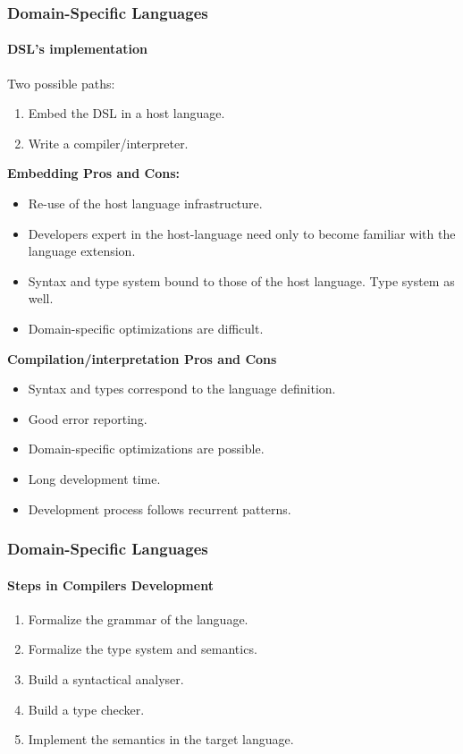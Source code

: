 \documentclass[10pt,a4paper]{beamer}
\begin{document}
\begin{frame}
\frametitle{Domain-Specific Languages}
\framesubtitle{DSL's implementation}

Two possible paths:

\begin{enumerate}
	\item Embed the DSL in a host language.
	\item Write a compiler/interpreter.
\end{enumerate}

\textbf{Embedding Pros and Cons:}

\begin{itemize}
	\item Re-use of the host language infrastructure.
	\item Developers expert in the host-language need only to become familiar with the language extension.
	\item Syntax and type system bound to those of the host language. Type system as well.
	\item Domain-specific optimizations are difficult.
\end{itemize}

\textbf{Compilation/interpretation Pros and Cons}

\begin{itemize}
	\item Syntax and types correspond to the language definition.
	\item Good error reporting.
	\item Domain-specific optimizations are possible.
	\item Long development time.
	\item Development process follows recurrent patterns.
\end{itemize}
\end{frame}

\begin{frame}
\frametitle{Domain-Specific Languages}
\framesubtitle{Steps in Compilers Development}
\begin{enumerate}
	\item Formalize the grammar of the language.
	\item Formalize the type system and semantics.
	\item Build a syntactical analyser.
	\item Build a type checker.
	\item Implement the semantics in the target language.
\end{enumerate}
\end{frame}
\end{document}
